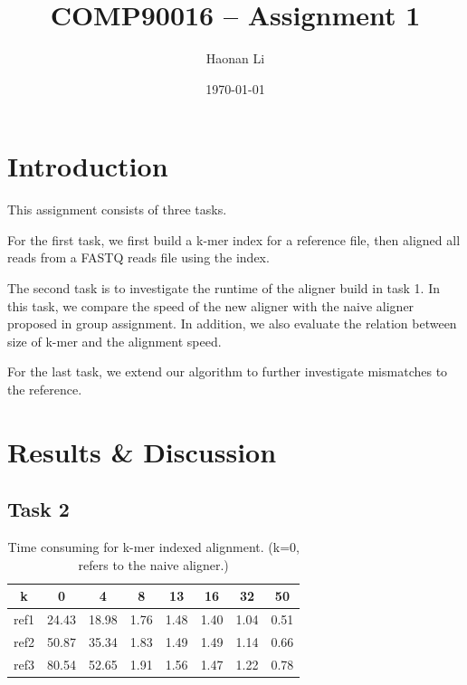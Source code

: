 \documentclass[a4paper]{article}
\title{\bfseries{COMP90016 -- Assignment 1 }}
\author{Haonan Li}
\date{\today}
\begin{document}
\maketitle

\section{Introduction}
\label{sec:introduction}

This assignment consists of three tasks. 

For the first task, we first build a k-mer index for a reference file, then aligned all reads from a FASTQ reads file using the index.

The second task is to investigate the runtime of the aligner build in task 1. In this task, we compare the speed of the new aligner with the naive aligner proposed in group assignment. In addition, we also evaluate the relation between size of k-mer and the alignment speed.

For the last task, we extend our algorithm to further investigate mismatches to the reference.

\section{Results \& Discussion}
\label{sec:experiment}
\subsection{Task 2}

\begin{table}[H]
	\centering
	\begin{tabular}{c|c|c|c|c|c|c|c}
		\hline
		k & 0 & 4 & 8 & 13 & 16 & 32 & 50 \\
		\hline
		ref1 & 24.43 & 18.98 & 1.76 & 1.48 & 1.40 & 1.04 & 0.51 \\
		\hline
		ref2 & 50.87 & 35.34 & 1.83 & 1.49 & 1.49 & 1.14 & 0.66 \\
		\hline
		ref3 & 80.54 & 52.65 & 1.91 & 1.56 & 1.47 & 1.22 & 0.78\\
		\hline
	\end{tabular}
	\caption{\label{tab:1}Time consuming for k-mer indexed alignment. (k=0, refers to  the naive aligner.)}
\end{table}
\end{document}
